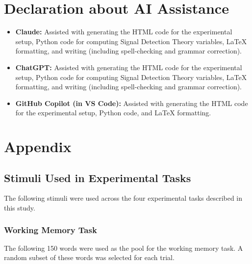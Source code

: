 \documentclass[12pt]{article} %
\begin{document}
\clearpage
\vspace*{-2cm}

% 


% 
% 


\section*{Declaration about AI Assistance}
\begin{itemize}
  \item \textbf{Claude:} Assisted with generating the HTML code for the experimental setup, Python code for computing Signal Detection Theory variables, LaTeX formatting, and writing (including spell-checking and grammar correction).
  \item \textbf{ChatGPT:} Assisted with generating the HTML code for the experimental setup, Python code for computing Signal Detection Theory variables, LaTeX formatting, and writing (including spell-checking and grammar correction).
  \item \textbf{GitHub Copilot (in VS Code):} Assisted with generating the HTML code for the experimental setup, Python code, and LaTeX formatting.
\end{itemize}

\appendix
\newpage
\section{Appendix}
\label{sec:appendix}

\subsection*{Stimuli Used in Experimental Tasks}

The following stimuli were used across the four experimental tasks described in this study.

\subsubsection*{Working Memory Task}

The following 150 words were used as the pool for the working memory task. 
A random subset of these words was selected for each trial.
\end{document}
